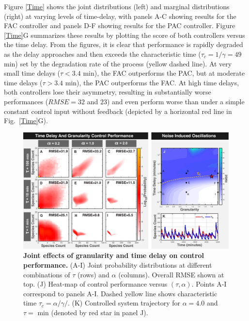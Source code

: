 \documentclass[12pt]{iopart}
\begin{document}
Figure \ref{Time} shows the joint distributions (left) and marginal distributions (right) at varying levels of time-delay, with panels A-C showing results for the FAC controller and panels D-F showing results for the PAC controller. Figure \ref{Time}G summarizes these results by plotting the score of both controllers versus the time delay. From the figures, it is clear that performance is rapidly degraded as the delay approaches and then exceeds the characteristic time ($\tau_c = 1 / \gamma = 49$ min) set by the degradation rate of the process (yellow dashed line). At very small time delays ($\tau< 3.4$ min), the FAC outperforms the PAC, but at moderate time delays ($\tau > 3.4$ min), the PAC outperforms the FAC.
At high time delays, both controllers lose their asymmetry, resulting in substantially worse performances ($RMSE = 32$ and $23$) and even perform worse than under a simple constant control input without feedback (depicted by a horizontal red line in Fig.\ \ref{Time}G). 

\begin{figure}
\begin{center}
\includegraphics[width=1\textwidth]{DelayAndGranularity.pdf}
\vspace{-0.1in}
\caption{{\bf Joint effects of granularity and time delay on control performance.} (A-I) Joint probability distributions at different combinations of $\tau$ (rows) and $\alpha$ (columns). Overall RMSE shown at top. (J) Heat-map of control performance versus $(\tau,\alpha)$. Points A-I correspond to panels A-I. Dashed yellow line shows characteristic time $\tau_c = \alpha/\gamma/$.
(K) Controlled system trajectory for $\alpha = 4.0$ and $\tau = $ min (denoted by red star in panel J).}
\label{DG}
\end{center}
\vspace{-0.2in}
\end{figure}
\end{document}

